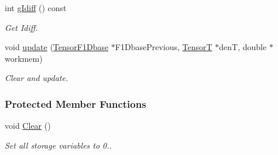 \begin{DoxyCompactItemize}
int \hyperlink{classCheMPS2_1_1TensorF1Dbase_a63b57d3e2fbc063714df5f6fc83d9e82}{g\-Idiff} () const 
\begin{DoxyCompactList}\small\item\em Get Idiff. \end{DoxyCompactList}\item 
void \hyperlink{classCheMPS2_1_1TensorF1Dbase_a2076a13eaccfa554f666331811216bc6}{update} (\hyperlink{classCheMPS2_1_1TensorF1Dbase}{Tensor\-F1\-Dbase} $\ast$F1\-Dbase\-Previous, \hyperlink{classCheMPS2_1_1TensorT}{Tensor\-T} $\ast$den\-T, double $\ast$workmem)
\begin{DoxyCompactList}\small\item\em Clear and update. \end{DoxyCompactList}\end{DoxyCompactItemize}
\subsubsection*{Protected Member Functions}
\begin{DoxyCompactItemize}
\item 
\hypertarget{classCheMPS2_1_1TensorF1Dbase_a4d761af9f1fef9a9187a5947c8510693}{void \hyperlink{classCheMPS2_1_1TensorF1Dbase_a4d761af9f1fef9a9187a5947c8510693}{Clear} ()}\label{classCheMPS2_1_1TensorF1Dbase_a4d761af9f1fef9a9187a5947c8510693}

\begin{DoxyCompactList}\small\item\em Set all storage variables to 0.. \end{DoxyCompactList}\end{DoxyCompactItemize}
